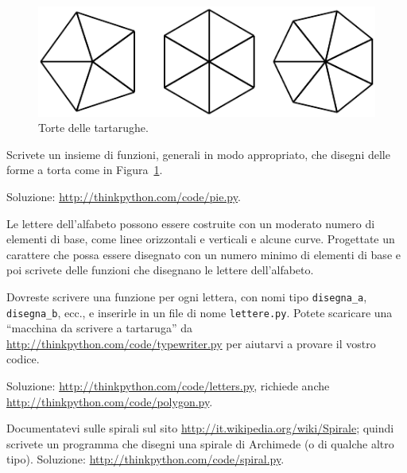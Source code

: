 \documentclass[10pt]{book}
\begin{document}
\begin{figure}
\centerline
{\includegraphics[scale=0.8]{figs/pies.pdf}}
\caption{Torte delle tartarughe.}
\label{fig.pies}
\end{figure}

\vspace{0.2in}
\begin{exercise}

Scrivete un insieme di funzioni, generali in modo appropriato, che disegni delle forme a torta come in Figura~\ref{fig.pies}.

Soluzione: \url{http://thinkpython.com/code/pie.py}.

\end{exercise}

\begin{exercise}

Le lettere dell'alfabeto possono essere costruite con un moderato numero di elementi di base, come linee orizzontali e verticali e alcune curve. Progettate un carattere che possa essere disegnato con un numero minimo di elementi di base e poi scrivete delle funzioni che disegnano le lettere dell'alfabeto.

Dovreste scrivere una funzione per ogni lettera, con nomi tipo
\verb"disegna_a", \verb"disegna_b", ecc., e inserirle in un file di nome {\tt lettere.py}.  Potete scaricare una ``macchina da scrivere a tartaruga'' da \url{http://thinkpython.com/code/typewriter.py}
per aiutarvi a provare il vostro codice.

Soluzione: \url{http://thinkpython.com/code/letters.py}, richiede anche
\url{http://thinkpython.com/code/polygon.py}.

\end{exercise}

\vspace{0.2in}
\begin{exercise}

Documentatevi sulle spirali sul sito \url{http://it.wikipedia.org/wiki/Spirale}; quindi scrivete un programma che disegni una spirale di Archimede (o di qualche altro tipo).  Soluzione: \url{http://thinkpython.com/code/spiral.py}.

\end{exercise}
\end{document}
